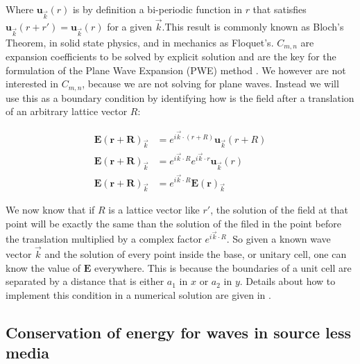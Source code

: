 Where $\mathbf{u}_{\vec{k}}(r)$ is by definition a bi-periodic function in $r$ that satisfies  $\mathbf{u}_{\vec{k}}(r+r') = \mathbf{u}_{\vec{k}}(r)$ for a given $\vec{k}$.This result is commonly known as Bloch's Theorem, in solid state physics, and in mechanics as Floquet's. $C_{m,n}$ are expansion coefficients to be solved by explicit solution and are the key for the formulation of the Plane Wave Expansion (PWE) method \cite{Loaiza2011, Joannopoulos2008, StevenG.Johnson2001}. We however are not interested in $C_{m,n}$, because we are not solving for plane waves. Instead we will use this as a boundary condition by identifying how is the field after a translation of an arbitrary lattice vector $R$:

\begin{align}
\mathbf{E(r+R)}_{\vec{k}} &= e^{i\vec{k}\cdot (r+R)} \mathbf{u}_{\vec{k}}(r+R)\\
\mathbf{E(r+R)}_{\vec{k}} &= e^{i\vec{k}\cdot R}e^{i\vec{k}\cdot r} \mathbf{u}_{\vec{k}}(r)\\
\mathbf{E(r+R)}_{\vec{k}} &= e^{i\vec{k}\cdot R}\mathbf{E(r)}_{\vec{k}} \label{eq:bloch_condition}
\end{align}

We now know that if $R$ is a lattice vector like $r'$, the solution of the field at that point will be exactly the same than the solution of the filed in the point before the translation multiplied by a complex factor $e^{i\vec{k}\cdot R}$. So given a known wave vector $\vec{k}$ and the solution of every point inside the base, or unitary cell, one can know the value of $\mathbf{E}$ everywhere. This is because the boundaries of a unit cell are separated by a distance that is either $a_1$ in $x$ or $a_2$ in $y$. Details about how to implement this condition in a numerical solution are given in \cite{Guarin2012}.

\subsection{Conservation of energy for waves in source less media}

